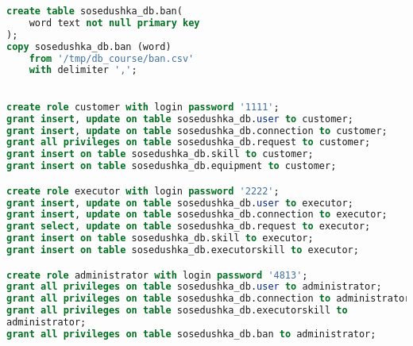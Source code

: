 \begin{lstlisting}[language=sql, caption=Создание и заполнение базы данных]
create table sosedushka_db.ban(
	word text not null primary key
);
copy sosedushka_db.ban (word)
	from '/tmp/db_course/ban.csv'
	with delimiter ',';
	

create role customer with login password '1111';
grant insert, update on table sosedushka_db.user to customer;
grant insert, update on table sosedushka_db.connection to customer;
grant all privileges on table sosedushka_db.request to customer;
grant insert on table sosedushka_db.skill to customer;
grant insert on table sosedushka_db.equipment to customer;

create role executor with login password '2222';
grant insert, update on table sosedushka_db.user to executor;
grant insert, update on table sosedushka_db.connection to executor;
grant select, update on table sosedushka_db.request to executor;
grant insert on table sosedushka_db.skill to executor;
grant insert on table sosedushka_db.executorskill to executor;

create role administrator with login password '4813';
grant all privileges on table sosedushka_db.user to administrator;
grant all privileges on table sosedushka_db.connection to administrator;
grant all privileges on table sosedushka_db.executorskill to
administrator;
grant all privileges on table sosedushka_db.ban to administrator;
\end{lstlisting}
\captionsetup{singlelinecheck=false, justification=centering}